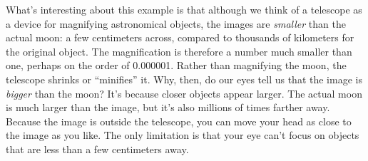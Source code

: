 What's interesting about this example is that although we think of a telescope
as a device for magnifying astronomical objects, the images are \emph{smaller} than the
actual moon: a few centimeters across, compared to thousands of kilometers for the
original object. The magnification is therefore a number much smaller than one,
perhaps on the order of 0.000001. Rather than magnifying the moon, the telescope
shrinks or ``minifies'' it. Why, then, do our eyes tell us that the image is
\emph{bigger} than the moon? It's because closer objects appear larger. The actual
moon is much larger than the image, but it's also millions of times farther away.
Because the image is outside the telescope, you can move your head as close to the
image as you like. The only limitation is that your eye can't focus on objects that
are less than a few centimeters away.

